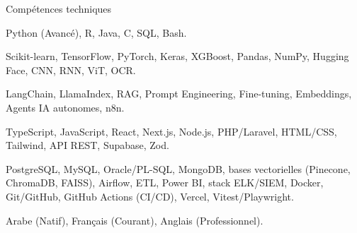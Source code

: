 
\begin{rubric}{Compétences techniques}

\entry*[Langages]
    Python (Avancé), R, Java, C, SQL, Bash.

    Scikit-learn, TensorFlow, PyTorch, Keras, XGBoost, Pandas, NumPy, Hugging Face, CNN, RNN, ViT, OCR.

    LangChain, LlamaIndex, RAG, Prompt Engineering, Fine-tuning, Embeddings, Agents IA autonomes, n8n.

    TypeScript, JavaScript, React, Next.js, Node.js, PHP/Laravel, HTML/CSS, Tailwind, API REST, Supabase, Zod.

    PostgreSQL, MySQL, Oracle/PL-SQL, MongoDB, bases vectorielles (Pinecone, ChromaDB, FAISS), Airflow, ETL, Power BI, stack ELK/SIEM, Docker, Git/GitHub, GitHub Actions (CI/CD), Vercel, Vitest/Playwright.

\entry*[Langues]
    Arabe (Natif), Français (Courant), Anglais (Professionnel).

\end{rubric}
